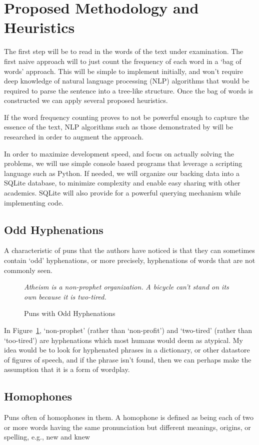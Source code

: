 
\section{Proposed Methodology and Heuristics}
The first step will be to read in the words of the text under examination. The first naive approach will to just count the frequency of each word in a `bag of words' approach. This will be simple to implement initially, and won't require deep knowledge of natural language processing (NLP) algorithms that would be required to parse the sentence into a tree-like structure. Once the bag of words is constructed we can apply several proposed heuristics.

If the word frequency counting proves to not be powerful enough to capture the essence of the text, NLP algorithms such as those demonstrated by \cite{stanfordparser} will be researched in order to augment the approach. 

In order to maximize development speed, and focus on actually solving the problems, we will use simple console based programs that leverage a scripting language such as Python. If needed, we will organize our backing data into a SQLite database, to minimize complexity and enable easy sharing with other academics. SQLite will also provide for a powerful querying mechanism while implementing code.

\subsection{Odd Hyphenations}
A characteristic of puns that the authors have noticed is that they can sometimes contain `odd' hyphenations, or more precisely, hyphenations of words that are not commonly seen.

\begin{figure}[h]
  \caption{Puns with Odd Hyphenations}
  \emph{Atheism is a non-prophet organization.}
  \emph{A bicycle can't stand on its own because it is two-tired.}
 \label{oddhyphen}
\end{figure}

In Figure~\ref{oddhyphen}, `non-prophet' (rather than `non-profit') and `two-tired' (rather than `too-tired') are hyphenations which most humans would deem as atypical. My idea would be to look for hyphenated phrases in a dictionary, or other datastore of figures of speech, and if the phrase isn't found, then we can perhaps make the assumption that it is a form of wordplay. 

\subsection{Homophones}
Puns often of homophones in them. A homophone is defined as being each of two or more words having the same pronunciation but different meanings, origins, or spelling, e.g., new and knew

